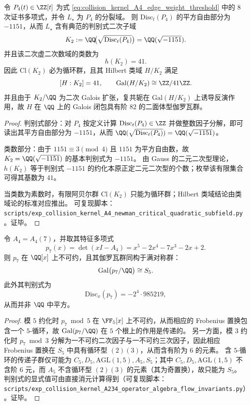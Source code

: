 



\begin{proposition}\label{prop:pom-a4t-newman-k2-class-number}
令 \(P_4(t)\in\ZZ[t]\) 为式 \eqref{eq:collision_kernel_A4_edge_weight_threshold} 中的 8 次证书多项式，并令 \(L_\star\) 为 \(P_4\) 的分裂域。
则 \(\mathrm{Disc}_t(P_4)\) 的平方自由部分为 \(-1151\)，从而 \(L_\star\) 含有典范的判别式二次子域
\[
K_2:=\QQ\!\bigl(\sqrt{\mathrm{Disc}_t(P_4)}\bigr)=\QQ(\sqrt{-1151}).
\]
并且该二次虚二次数域的类数为
\[
h(K_2)=41.
\]
因此 \(\mathrm{Cl}(K_2)\) 必为循环群，且其 Hilbert 类域 \(H/K_2\) 满足
\[
[H:K_2]=41,\qquad \mathrm{Gal}(H/K_2)\cong \ZZ/41\ZZ.
\]
并且由于 \(K_2/\QQ\) 为二次 Galois 扩张，复共轭在 \(\mathrm{Gal}(H/K_2)\) 上诱导反演作用，故 \(H\) 在 \(\QQ\) 上的 Galois 闭包具有阶 \(82\) 的二面体型伽罗瓦群。
\end{proposition}
\begin{proof}
判别式部分：对 \(P_4\) 按定义计算 \(\mathrm{Disc}_t(P_4)\in\ZZ\) 并做整数因子分解，即可读出其平方自由部分为 \(-1151\)，从而 \( \QQ(\sqrt{\mathrm{Disc}_t(P_4)})=\QQ(\sqrt{-1151}) \)。
\par
类数部分：由于 \(1151\equiv 3\pmod 4\) 且 \(1151\) 为平方自由数，故 \(K_2=\QQ(\sqrt{-1151})\) 的基本判别式为 \(-1151\)。
由 Gauss 的二元二次型理论，\(h(K_2)\) 等于判别式 \(-1151\) 的约化本原正定二元二次型的个数；枚举该有限集合可得其基数为 \(41\)。
\par
当类数为素数时，有限阿贝尔群 \(\mathrm{Cl}(K_2)\) 只能为循环群；Hilbert 类域结论由类域论的标准对应推出。
可复现脚本：\texttt{scripts/exp\_collision\_kernel\_A4\_newman\_critical\_quadratic\_subfield.py}。证毕。
\end{proof}



\begin{proposition}[四阶碰撞核的分裂域与满对称伽罗瓦群]\label{prop:pom-a4-galois-s5}
令 \(A_4=A_4(7)\)，并取其特征多项式
\[
p_7(x)=\det(xI-A_4)=x^5-2x^4-7x^3-2x+2.
\]
则 \(p_7\) 在 \(\QQ[x]\) 上不可约，且其伽罗瓦群同构于满对称群：
\[
\mathrm{Gal}\bigl(p_7/\QQ\bigr)\cong S_5.
\]
此外其判别式为
\[
\mathrm{Disc}_x(p_7)=-2^4\cdot 985219,
\]
从而并非 \(\QQ\) 中平方。
\end{proposition}
\begin{proof}
模 \(5\) 约化时 \(p_7\bmod 5\) 在 \(\FF_5[x]\) 上不可约，从而相应的 Frobenius 置换包含一个 \(5\)-循环，故 \(\mathrm{Gal}(p_7/\QQ)\) 在 \(5\) 个根上的作用是传递的。
另一方面，模 \(3\) 约化时 \(p_7\bmod 3\) 分解为一不可约二次因子与一不可约三次因子，因此相应 Frobenius 置换在 \(S_5\) 中具有循环型 \((2)(3)\)，从而含有阶为 \(6\) 的元素。
含 \(5\)-循环的传递子群仅可能为 \(C_5,D_5,\mathrm{AGL}(1,5),A_5,S_5\)；其中 \(C_5,D_5,\mathrm{AGL}(1,5)\) 不含阶 \(6\) 元，而 \(A_5\) 不含循环型 \((2)(3)\) 的元素（其为奇置换），故只能为 \(S_5\)。
判别式的显式值可由直接消元计算得到（可复现脚本：\texttt{scripts/exp\_collision\_kernel\_A234\_operator\_algebra\_flow\_invariants.py}）。证毕。
\end{proof}


